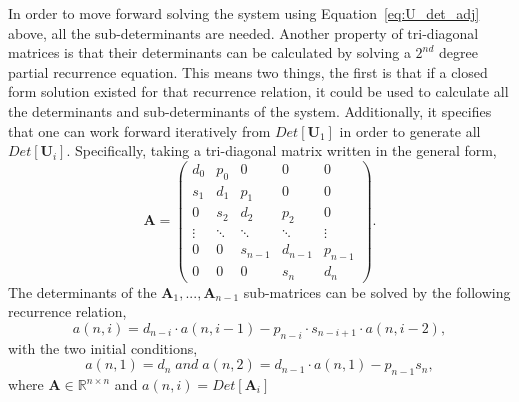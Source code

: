 \documentclass[review]{elsarticle}
\let\bs\boldsymbol
\begin{document}
In order to move forward solving the system using Equation~\ref{eq:U_det_adj} above, all the sub-determinants are needed.
Another property of tri-diagonal matrices is that their determinants can be calculated by solving a $2^{nd}$ degree partial recurrence equation.
This means two things, the first is that if a closed form solution existed for that recurrence relation, it could be used to calculate all the determinants and sub-determinants of the system.
Additionally, it specifies that one can work forward iteratively from $Det[\bs{U}_{1}]$ in order to generate all $Det[\bs{U}_{i}]$. %
Specifically, taking a tri-diagonal matrix written in the general form,
\[\bs{A}=
\left(\begin{array}{ccccc}
d_{0} & p_{0} & 0 & 0 & 0\\
s_{1} & d_{1} & p_{1} & 0 & 0\\
0 & s_{2} & d_{2} & p_{2} & 0\\
\vdots & \ddots & \ddots & \ddots & \vdots\\
0 & 0 & s_{n-1} & d_{n-1} & p_{n-1}\\
0 & 0 & 0 & s_{n} & d_{n}
\end{array}\right).
\]
The determinants of the $\bs{A}_{1},...,\bs{A}_{n-1}$ sub-matrices can be solved by the following recurrence relation, 
\begin{equation}\label{eq:recurrence_general}
a(n,i)=d_{n-i}\cdot a(n,i-1)-p_{n-i}\cdot s_{n-i+1}\cdot a(n,i-2),
\end{equation}
with the two initial conditions,
\begin{equation}\label{eq:recurrence_general_ic}
a(n,1)=d_{n}\; and\; a(n,2)=d_{n-1}\cdot a(n,1)-p_{n-1}s_{n},
\end{equation}
where $\bs{A}\in\mathbb{R}^{n\times n}$ and $a(n,i)=Det[\bs{A}_i]$

\end{document}
